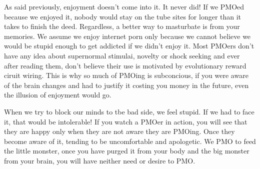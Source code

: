 As said previously, enjoyment doesn't come into it. It never did! If we PMOed because we enjoyed it, nobody would stay on the tube sites for longer than it takes to finish the deed. Regardless, a better way to masturbate is from your memories. We assume we enjoy internet porn only because we cannot believe we would be stupid enough to get addicted if we didn't enjoy it. Most PMOers don't have any idea about supernormal stimulai, novelty or shock seeking and ever after reading them, don't believe their use is motivated by evolutionary reward ciruit wiring. This is why so much of PMOing is subconcious, if you were aware of the brain changes and had to justify it costing you money in the future, even the illusion of enjoyment would go.

When we try to block our minds to tbe bad side, we feel stupid. If we had to face it, that would be intolerable! If you watch a PMOer in action, you will see that they are happy only when they are not aware they are PMOing. Once they become aware of it, tending to be uncomfortable and apologetic. We PMO to feed the little monster, once you have purged it from your body and the big monster from your brain, you will have neither need or desire to PMO.
